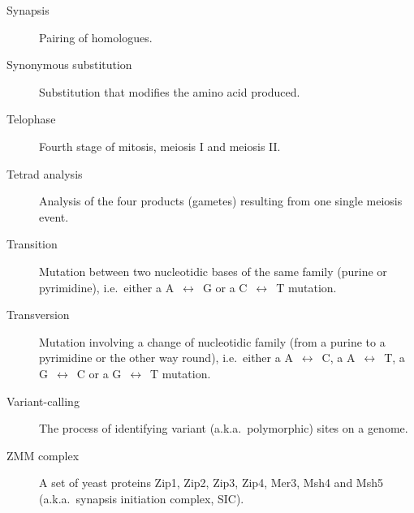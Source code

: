 \begin{alwayssingle}
\begin{description}
		\item[Synapsis] Pairing of homologues.
		\item[Synonymous substitution] Substitution that modifies the amino acid produced.
		\item[Telophase] Fourth stage of mitosis, meiosis I and meiosis II\@.
		\item[Tetrad analysis] Analysis of the four products (gametes) resulting from one single meiosis event.
		\item[Transition] Mutation between two nucleotidic bases of the same family (purine or pyrimidine), i.e.\ either a A~$\leftrightarrow$~G or a C~$\leftrightarrow$~T mutation.
		\item[Transversion] Mutation involving a change of nucleotidic family (from a purine to a pyrimidine or the other way round), i.e.\ either a A~$\leftrightarrow$~C, a A~$\leftrightarrow$~T, a G~$\leftrightarrow$~C or a G~$\leftrightarrow$~T mutation.
		\item[Variant-calling] The process of identifying variant (a.k.a.\ polymorphic) sites on a genome.
		\item[ZMM complex] A set of yeast proteins Zip1, Zip2, Zip3, Zip4, Mer3, Msh4 and Msh5 (a.k.a.\ synapsis initiation complex, SIC).








	\end{description}
\end{alwayssingle}
\mtcaddchapter{}


